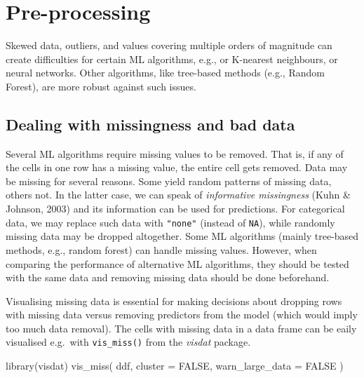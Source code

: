 \documentclass[
]{book}
\newenvironment{Shaded}{\begin{snugshade}}{\end{snugshade}}
\newcommand{\AttributeTok}[1]{\textcolor[rgb]{0.77,0.63,0.00}{#1}}
\newcommand{\ConstantTok}[1]{\textcolor[rgb]{0.00,0.00,0.00}{#1}}
\newcommand{\FunctionTok}[1]{\textcolor[rgb]{0.00,0.00,0.00}{#1}}
\newcommand{\NormalTok}[1]{#1}
\begin{document}
\hypertarget{preprocessing}{%
\chapter{Pre-processing}\label{preprocessing}}

Skewed data, outliers, and values covering multiple orders of magnitude can create difficulties for certain ML algorithms, e.g., or K-nearest neighbours, or neural networks. Other algorithms, like tree-based methods (e.g., Random Forest), are more robust against such issues.

\hypertarget{dealing-with-missingness-and-bad-data}{%
\section{Dealing with missingness and bad data}\label{dealing-with-missingness-and-bad-data}}

Several ML algorithms require missing values to be removed. That is, if any of the cells in one row has a missing value, the entire cell gets removed. Data may be missing for several reasons. Some yield random patterns of missing data, others not. In the latter case, we can speak of \emph{informative missingness} (Kuhn \& Johnson, 2003) and its information can be used for predictions. For categorical data, we may replace such data with \texttt{"none"} (instead of \texttt{NA}), while randomly missing data may be dropped altogether. Some ML algorithms (mainly tree-based methods, e.g., random forest) can handle missing values. However, when comparing the performance of alternative ML algorithms, they should be tested with the same data and removing missing data should be done beforehand.

Visualising missing data is essential for making decisions about dropping rows with missing data versus removing predictors from the model (which would imply too much data removal). The cells with missing data in a data frame can be eaily visualised e.g.~with \texttt{vis\_miss()} from the \emph{visdat} package.

\begin{Shaded}
\begin{Highlighting}[]
\FunctionTok{library}\NormalTok{(visdat)}
\FunctionTok{vis\_miss}\NormalTok{(}
\NormalTok{  ddf,}
  \AttributeTok{cluster =} \ConstantTok{FALSE}\NormalTok{, }
  \AttributeTok{warn\_large\_data =} \ConstantTok{FALSE}
\NormalTok{  )}
\end{Highlighting}
\end{Shaded}
\end{document}
